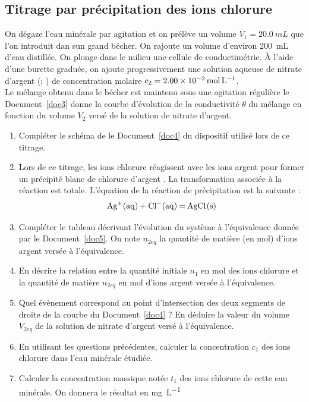 \documentclass[a4paper,14pt,fleqn]{article}%
\begin{document}
\subsection{Titrage par précipitation des ions chlorure}
On dégaze l'eau minérale par agitation et on prélève un volume $V_1 = \SI{20,0}{mL}$ que l'on introduit dan sun grand bécher. On rajoute un volume d'environ \SI{200}{mL} d'eau distillée. On plonge dans le milieu une cellule de conductimétrie. À l'aide d'une burette graduée, on ajoute progressivement une solution aqueuse de nitrate d'argent (; ) de concentration molaire $c_2 = \SI{2,00E-2}{\mole\per\liter}$.\\
Le mélange obtenu dans le bécher est maintenu sous une agitation régulière le Document~\ref{doc3} donne la courbe d'évolution de la conductivité $\theta$ du mélange en fonction du volume $V_2$ versé de la solution de nitrate d'argent.
\begin{enumerate}
    \item Compléter le schéma de le Document~\ref{doc4} du dispositif utilisé lors de ce titrage.
    \item Lors de ce titrage, les ions chlorure  réagissent avec les ions argent  pour former un précipité blanc de chlorure d'argent . La transformation associée à la réaction est totale. L'équation de la réaction de précipitation est la suivante :
    $$ \ce{Ag+(aq) + Cl-(aq) = AgCl(s)}$$
        \item Compléter le tableau décrivant l'évolution du système à l'équivalence donnée par le Document~\ref{doc5}. On note $n_{2eq}$ la quantité de matière (en \unit{\mole}) d'ions argent versée à l'équivalence.
        \item En décrire la relation entre la quantité initiale $n_1$ en \unit{\mole} des ions chlorure et la quantité de matière $n_{2eq}$ en \unit{\mole} d'ions argent versée à l'équivalence.
        \item Quel évènement correspond au point d'intersection des deux segments de droite de la courbe du Document~\ref{doc4} ? En déduire la valeur du volume $V_{2eq}$ de la solution de nitrate d'argent versé à l'équivalence.
        \item En utilisant les questions précédentes, calculer la concentration $c_1$ des ions chlorure dans l'eau minérale étudiée.
        \item Calculer la concentration massique notée $t_1$ des ions chlorure de cette eau minérale. On donnera le résultat en \unit{\milli\gram\per\liter}
\end{enumerate}
\end{document}
